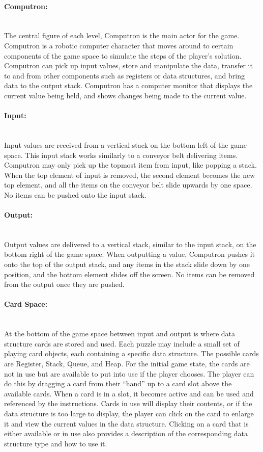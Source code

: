 \paragraph{Computron:} ~\\
The central figure of each level, Computron is the main actor for the game. Computron is 
a robotic computer character that moves around to certain components of the game space 
to simulate the steps of the player's solution. Computron can pick up input values, store 
and manipulate the data, transfer it to and from other components such as registers or data 
structures, and bring data to the output stack. Computron has a computer monitor that 
displays the current value being held, and shows changes being made to the current value.

\paragraph{Input:} ~\\
Input values are received from a vertical stack on the bottom left of the game space. This 
input stack works similarly to a conveyor belt delivering items. Computron may only pick 
up the topmost item from input, like popping a stack. When the top element of input is 
removed, the second element becomes the new top element, and all the items on the conveyor 
belt slide upwards by one space. No items can be pushed onto the input stack.

\paragraph{Output:} ~\\
Output values are delivered to a vertical stack, similar to the input stack, on the bottom right 
of the game space. When outputting a value, Computron pushes it onto the top of the output 
stack, and any items in the stack slide down by one position, and the bottom element slides 
off the screen. No items can be removed from the output once they are pushed.

\paragraph{Card Space:} ~\\
At the bottom of the game space between input and output is where data structure cards 
are stored and used. Each puzzle may include a small set of playing card objects, each 
containing a specific data structure. The possible cards are Register, Stack, Queue, and 
Heap. For the initial game state, the cards are not in use but are available to put into use if 
the player chooses. The player can do this by dragging a card from their ``hand'' up to a 
card slot above the available cards. When a card is in a slot, it becomes active and can be 
used and referenced by the instructions. Cards in use will display their contents, or if the 
data structure is too large to display, the player can click on the card  to enlarge it and view 
the current values in the data structure. Clicking on a card that is either available or in use 
also provides a description of the corresponding data structure type and how to use it.